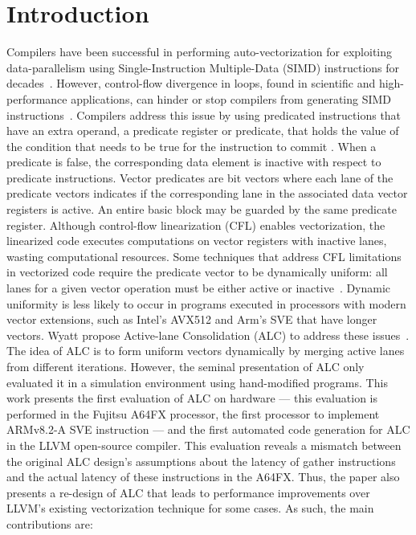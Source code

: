 \section{Introduction}

Compilers have been successful in performing auto-vectorization for exploiting data-parallelism using Single-Instruction Multiple-Data (SIMD) instructions for decades~\cite{scarborough1986vectorizing,levine1991comparative,sreraman2000vectorizing,maleki2011evaluation}.
However, control-flow divergence in loops, found in scientific and high-performance applications, can hinder or stop compilers from generating SIMD instructions~\cite{allen_conversion_1983,park1991ifconversion}.
Compilers address this issue by using predicated instructions that have an extra operand, a predicate register or predicate, that holds the value of the condition that needs to be true for the instruction to commit \cite{allen_conversion_1983,park1991ifconversion,jaewook_shin_superword-level_2005,shin_introducing_2007,shin_evaluating_2009}.
When a predicate is false, the corresponding data element is inactive with respect to predicate instructions.
Vector predicates are bit vectors where each lane of the predicate vectors indicates if the corresponding lane in the associated data vector registers is active.
An entire basic block may be guarded by the same predicate register.
Although control-flow linearization (CFL) enables vectorization, the linearized code executes computations on vector registers with inactive lanes, wasting computational resources.
Some techniques that address CFL limitations in vectorized code require the predicate vector to be dynamically uniform: all lanes for a given vector operation must be either active or inactive~\cite{moll_partial_2018,liu_combining_2022}.
Dynamic uniformity is less likely to occur in programs executed in processors with modern vector extensions, such as Intel's AVX512 and Arm's SVE that have longer vectors.
Wyatt \etal propose Active-lane Consolidation (ALC) to address these issues~\cite{praharenka_vectorizing_2022}.
The idea of ALC is to form uniform vectors dynamically by merging active lanes from different iterations. 
However, the seminal presentation of ALC only evaluated it in a simulation environment using hand-modified programs.
This work presents the first evaluation of ALC on hardware --- this evaluation is performed in the Fujitsu A64FX processor, the first processor to implement ARMv8.2-A SVE instruction --- and the first automated code generation for ALC in the LLVM open-source compiler.
This evaluation reveals a mismatch between the original ALC design's assumptions about the latency of gather instructions and the actual latency of these instructions in the A64FX.
Thus, the paper also presents a re-design of ALC that leads to performance improvements over LLVM's existing vectorization technique for some cases.
As such, the main contributions are:


